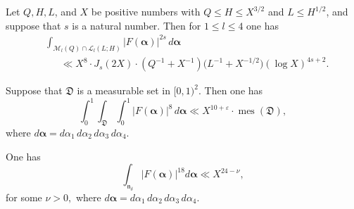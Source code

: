 \documentclass[10pt,a4paper]{amsart}
\DeclareMathOperator{\mes}{mes}
\begin{document}
\begin{lemma}\label{improved minor}
    Let $Q, H, L$, and $X$ be positive numbers with $Q \leq H\leq X^{3/2}$ and $L\leq H^{1/2}$, and suppose that $s $ is a natural number. Then for $1\leq l\leq 4$ one has 
    \begin{equation*}\label{sharp bound for T}
    \begin{aligned}
        & \int_{\mathcal{M}_l(Q)\cap \mathcal{L}_{l}(L;H)} |F(\boldsymbol{\alpha})|^{2s}\, d\boldsymbol{\alpha}  \\
        & \ \ \ \ \ \ \ \ll X^{8} \cdot J_s(2X)\cdot \left(Q^{-1}+X^{-1}\right)\bigl(L^{-1}+X^{-1/2}\bigr)(\log X)^{4s+2}.
    \end{aligned}
    \end{equation*}
\end{lemma}

\begin{lemma}\label{k-1 dim measure}
    Suppose that $\mathfrak{D}$ is a measurable set in $[0,1)^{2}$.  Then one has
    \begin{equation*}
        \int_0^1\int_{\mathfrak{D}}\int_0^1 |F(\boldsymbol{\alpha})|^{8} \, d\boldsymbol{\alpha}\ll X^{10+\varepsilon}\cdot \mes{(\mathfrak{D})},
    \end{equation*}
where $d\boldsymbol{\alpha}=d\alpha_1 \, d\alpha_2 \, d\alpha_3 \, d\alpha_4.$
\end{lemma}

\begin{lemma}\label{prop3.2}
    One has
    \begin{equation*}\label{claim in lemma 3.2}
\int_{\mathfrak{n}_{\delta}}|F(\boldsymbol{\alpha})|^{18}d\boldsymbol{\alpha}\ll X^{24-\nu},
    \end{equation*}
    for some $\nu>0,$ where $d\boldsymbol{\alpha}=d\alpha_1 \, d\alpha_2 \, d\alpha_3 \, d\alpha_4.$
\end{lemma}
\end{document}
